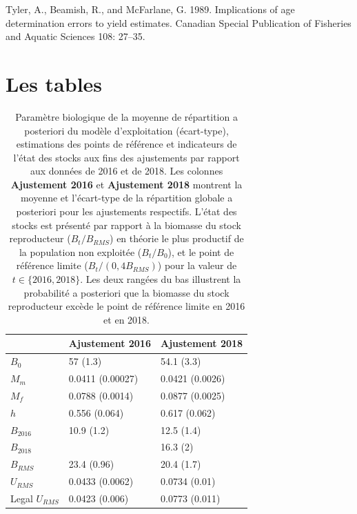 \documentclass[11pt]{book}
\begin{document}
\leavevmode\hypertarget{ref-tyler1989implications}{}%
Tyler, A., Beamish, R., and McFarlane, G. 1989. Implications of age determination errors to yield estimates. Canadian Special Publication of Fisheries and Aquatic Sciences 108: 27--35.

\setlength{\parindent}{0in} 
\setlength{\leftskip}{0in} 
\setlength{\parskip}{4pt}

\newpage
\setcounter{table}{0}

\hypertarget{les-tables}{%
\section{Les tables}\label{les-tables}}

\begingroup\fontsize{12}{14}\selectfont
\begin{longtable}[t]{lll}
\caption{\label{tab:unnamed-chunk-5}Paramètre biologique de la moyenne de répartition a posteriori du modèle d’exploitation (écart-type), estimations des points de référence et indicateurs de l’état des stocks aux fins des ajustements par rapport aux données de 2016 et de 2018. Les colonnes \textbf{Ajustement 2016} et \textbf{Ajustement 2018} montrent la moyenne et l’écart-type de la répartition globale a posteriori pour les ajustements respectifs. L’état des stocks est présenté par rapport à la biomasse du stock reproducteur ($B_t/B_{RMS}$) en théorie le plus productif de la population non exploitée ($B_t/B_0 $), et le point de référence limite ($B_t/(0,4B_{RMS})$) pour la valeur de $t \in \{2016, 2018\}$. Les deux rangées du bas illustrent la probabilité a posteriori que la biomasse du stock reproducteur excède le point de référence limite en 2016 et en 2018.}\\
\toprule
\textbf{ } & \textbf{Ajustement 2016} & \textbf{Ajustement 2018}\\
\midrule
$B_0$ & 57 (1.3) & 54.1 (3.3)\\
$M_m$ & 0.0411 (0.00027) & 0.0421 (0.0026)\\
$M_f$ & 0.0788 (0.0014) & 0.0877 (0.0025)\\
$h$ & 0.556 (0.064) & 0.617 (0.062)\\
$B_{2016}$ & 10.9 (1.2) & 12.5 (1.4)\\
$B_{2018}$ &  & 16.3 (2)\\
$B_{RMS}$ & 23.4 (0.96) & 20.4 (1.7)\\
$U_{RMS}$ & 0.0433 (0.0062) & 0.0734 (0.01)\\
Legal $U_{RMS}$ & 0.0423 (0.006) & 0.0773 (0.011)\\

\end{longtable}
\end{document}
